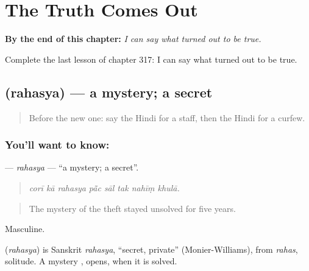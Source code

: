 
\chapter{The Truth Comes Out}
\label{ch:hi-the-truth-comes-out}

\begin{chapteropening}
\textbf{By the end of this chapter:} \emph{I can say what turned out to be true.}

Complete the last lesson of chapter 317: I can say what turned out to be true.
\end{chapteropening}

\section[\texorpdfstring{\hi{रहस्य} (rahasya)}{रहस्य (rahasya)}]{ (rahasya) — a mystery; a secret}

\label{lesson:HI-C317-rahasya}



\begin{quote}
Before the new one: say the Hindi for a staff, then the Hindi for a curfew.
\end{quote}

\subsection*{You'll want to know: }
\textbf{} — \emph{rahasya} — \textquotedblleft{}a mystery; a secret\textquotedblright{}.

\begin{quote}
       
\end{quote}

\begin{quote}
\emph{corī kā rahasya pā̃c sāl tak nahīṃ khulā.}
\end{quote}

\begin{quote}
The mystery of the theft stayed unsolved for five years.
\end{quote}

Masculine.

\begin{cousinweb}
\textbf{} (\emph{rahasya}) is Sanskrit \emph{rahasya}, \textquotedblleft{}secret, private\textquotedblright{} (Monier-Williams), from \emph{rahas}, solitude. A mystery \textbf{ }, opens, when it is solved.
\end{cousinweb}

